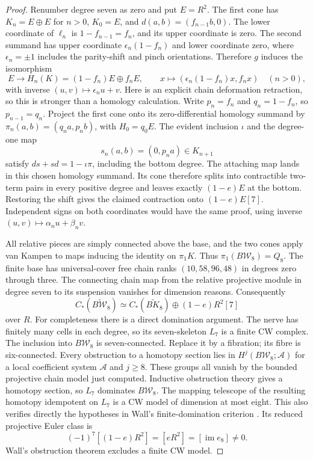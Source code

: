 \begin{proof}
Renumber degree seven as zero and put $E=R^2$. The first cone
has $K_n=E\oplus E$ for $n>0$, $K_0=E$, and
$d(a,b)=(f_{n-1}b,0)$. The lower coordinate of $\ell_n$ is
$1-f_{n-1}=f_n$, and its upper coordinate is zero.
The second summand has upper coordinate
$\epsilon_n(1-f_n)$ and lower coordinate zero, where
$\epsilon_n=\pm1$ includes the parity-shift and pinch
orientations. Therefore $g$ induces the isomorphism
\[
 E\longrightarrow H_n(K)=(1-f_n)E\oplus f_nE,\qquad
 x\longmapsto(\epsilon_n(1-f_n)x,f_nx)\quad(n>0),
\]
with inverse $(u,v)\mapsto\epsilon_nu+v$.
Here is an explicit chain deformation retraction, so this is
stronger than a homology calculation. Write $p_n=f_n$ and
$q_n=1-f_n$, so $p_{n-1}=q_n$. Project the first cone onto its
zero-differential homology summand by
$\pi_n(a,b)=(q_na,p_nb)$, with $H_0=q_0E$.
The evident inclusion $\iota$ and the degree-one map
\[
 s_n(a,b)=(0,p_na)\in K_{n+1}
\]
satisfy $ds+sd=1-\iota\pi$, including the bottom degree.
The attaching map lands in this chosen homology summand.
Its cone therefore splits into contractible two-term pairs in
every positive degree and leaves exactly $(1-e)E$ at the bottom.
Restoring the shift gives the claimed contraction onto
$(1-e)E[7]$. Independent signs on both coordinates would have
the same proof, using inverse $(u,v)\mapsto\alpha_nu+\beta_nv$.

All relative pieces are simply connected above the base, and
the two cones apply van Kampen to maps inducing the identity
on $\pi_1K$. Thus $\pi_1(B\mathcal W_8)=Q_8$.
The finite base has universal-cover free chain ranks
$(10,58,96,48)$ in degrees zero through three. The connecting
chain map from the relative projective module in degree seven
to its suspension vanishes for dimension reasons. Consequently
\[
 C_*(\widetilde{B\mathcal W_8})\simeq
 C_*(\widetilde{BK_8})\oplus(1-e)R^2[7]
\]
over $R$. For completeness there is a direct domination argument.
The nerve has finitely many cells in each degree, so its
seven-skeleton $L_7$ is a finite CW complex. The inclusion into
$B\mathcal W_8$ is seven-connected. Replace it by a fibration;
its fibre is six-connected. Every obstruction to a homotopy
section lies in $H^j(B\mathcal W_8;\mathcal A)$ for a local
coefficient system $\mathcal A$ and $j\geq8$.
These groups all vanish by the bounded projective chain model
just computed. Inductive obstruction theory gives a homotopy
section, so $L_7$ dominates $B\mathcal W_8$.
The mapping telescope of the resulting homotopy idempotent
on $L_7$ is a CW model of dimension at most eight.
This also verifies directly the hypotheses in Wall's
finite-domination criterion \cite{wall1965D}.
Its reduced projective Euler class is
\[
 (-1)^7[(1-e)R^2]=[eR^2]=[\operatorname{im}e_8]\ne0.
\]
Wall's obstruction theorem \cite[Theorem F]{wall1965D}
excludes a finite CW model.


\end{proof}
